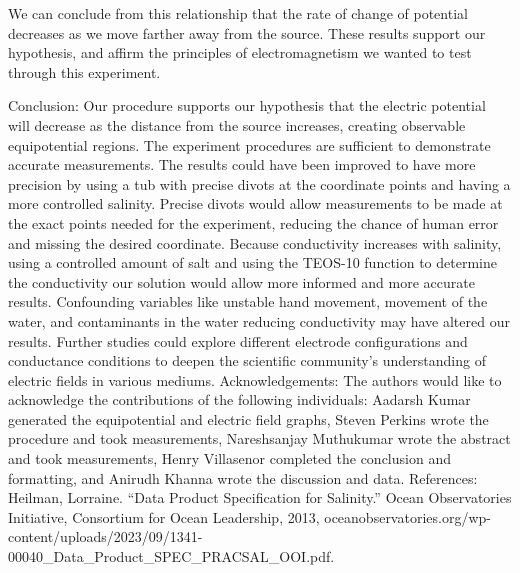         We can conclude from this relationship that the rate of change of potential decreases as we move farther away from the source. These results support our hypothesis, and affirm the principles of electromagnetism we wanted to test through this experiment. 


Conclusion:
        Our procedure supports our hypothesis that the electric potential will decrease as the distance from the source increases, creating observable equipotential regions. The experiment procedures are sufficient to demonstrate accurate measurements. The results could have been improved to have more precision by using a tub with precise divots at the coordinate points and having a more controlled salinity. Precise divots would allow measurements to be made at the exact points needed  for the experiment, reducing the chance of human error and missing the desired coordinate. Because conductivity increases with salinity, using a controlled amount of salt and using the TEOS-10 function to determine the conductivity our solution would allow more informed and more accurate results. Confounding variables like unstable hand movement, movement of the water, and contaminants in the water reducing conductivity may have altered our results. Further studies could explore different electrode configurations and conductance conditions to deepen the scientific community’s understanding of electric fields in various mediums.
Acknowledgements: 
The authors would like to acknowledge the contributions of the following individuals: Aadarsh Kumar generated the equipotential and electric field graphs, Steven Perkins wrote the procedure and took measurements, Nareshsanjay Muthukumar wrote the abstract and took measurements, Henry Villasenor completed the conclusion and formatting, and Anirudh Khanna wrote the discussion and data.
References: 
Heilman, Lorraine. “Data Product Specification for Salinity.” Ocean Observatories Initiative, Consortium for Ocean Leadership, 2013, oceanobservatories.org/wp-content/uploads/2023/09/1341-00040_Data_Product_SPEC_PRACSAL_OOI.pdf.